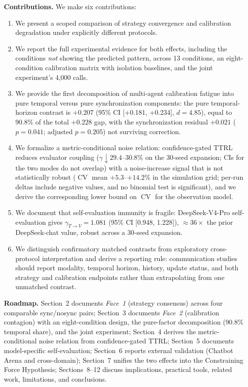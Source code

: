 \documentclass[11pt]{article}
\DeclareMathOperator{\CV}{CV}
\begin{document}
\textbf{Contributions.} We make six contributions:
\begin{enumerate}[leftmargin=*,nosep]
 \item We present a scoped comparison of strategy convergence and calibration degradation under explicitly different protocols.
 \item We report the full experimental evidence for both effects, including the conditions \textit{not} showing the predicted pattern, across 13 conditions, an eight-condition calibration matrix with isolation baselines, and the joint experiment's 4,000 calls.
 \item We provide the first decomposition of multi-agent calibration fatigue into pure temporal versus pure synchronization components: the pure temporal-horizon contrast is $+0.207$ (95\% CI [+0.181, +0.234], $d{=}4.85$), equal to 90.8\% of the total $+0.228$ gap, with the synchronization residual $+0.021$ ($p{=}0.041$; adjusted $p{=}0.205$) not surviving correction.
 \item We formalize a metric-conditional noise relation: confidence-gated TTRL reduces evaluator coupling ($\gamma \downarrow 29.4$--$30.8\%$ on the 30-seed expansion; CIs for the two modes do not overlap) with a noise-increase signal that is not statistically robust ($\CV$ mean $+5.3$--$+14.2\%$ in the simulation grid; per-run deltas include negative values, and no binomial test is significant), and we derive the corresponding lower bound on $\CV$ for the observation model.
 \item We document that self-evaluation immunity is fragile: DeepSeek-V4-Pro self-evaluation gives $\gamma_{T\to V}{=}1.081$ (95\% CI [0.948, 1.228]), $\approx 36\times$ the prior DeepSeek-chat value, robust across a 30-seed expansion.
 \item We distinguish confirmatory matched contrasts from exploratory cross-protocol interpretation and derive a reporting rule: communication studies should report modality, temporal horizon, history, update status, and both strategy and calibration endpoints rather than extrapolating from one unmatched contrast.
\end{enumerate}

\noindent\textbf{Roadmap.} Section~2 documents \textit{Face~1} (strategy consensus) across four comparable sync/nosync pairs; Section~3 documents \textit{Face~2} (calibration contagion) with an eight-condition design, the pure-factor decomposition (90.8\% temporal share), and the joint experiment; Section~4 derives the metric-conditional noise relation from confidence-gated TTRL; Section~5 documents model-specific self-evaluation; Section~6 reports external validation (Chatbot Arena and cross-domain); Section~7 unifies the two effects into the Constraining Force Hypothesis; Sections~8--12 discuss implications, practical tools, related work, limitations, and conclusions.
\end{document}
